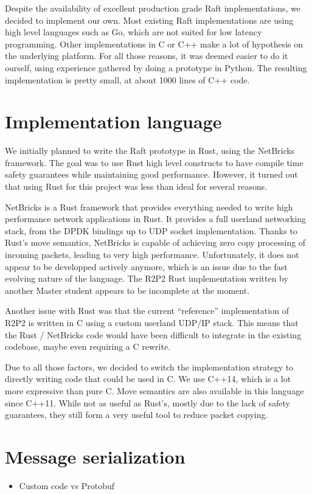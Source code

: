 Despite the availability of excellent production grade Raft implementations, we decided to implement our own.
Most existing Raft implementations are using high level languages such as Go, which are not suited for low latency programming.
Other implementations in C or C++ make a lot of hypothesis on the underlying platform.
For all those reasons, it was deemed easier to do it ourself, using experience gathered by doing a prototype in Python.
The resulting implementation is pretty small, at about 1000 lines of C++ code.

\section{Implementation language}

We initially planned to write the Raft prototype in Rust, using the NetBricks\cite{netbricks} framework.
The goal was to use Rust high level constructs to have compile time safety guarantees while maintaining good performance.
However, it turned out that using Rust for this project was less than ideal for several reasons.

NetBricks\cite{netbricks} is a Rust framework that provides everything needed to write high performance network applications in Rust.  %
It provides a full userland networking stack, from the DPDK bindings up to UDP socket implementation.
Thanks to Rust's move semantics, NetBricks is capable of achieving zero copy processing of incoming packets, leading to very high performance.
Unfortunately, it does not appear to be developped actively anymore, which is an issue due to the fast evolving nature of the language.
The R2P2 Rust implementation\cite{ogier} written by another Master student appears to be incomplete at the moment.

Another issue with Rust was that the current ``reference'' implementation of R2P2 is written in C using a custom userland UDP/IP stack.
This means that the Rust / NetBricks code would have been difficult to integrate in the existing codebase, maybe even requiring a C rewrite.

Due to all those factors, we decided to switch the implementation strategy to directly writing code that could be used in C.
We use C++14, which is a lot more expressive than pure C.
Move semantics are also available in this language since C++11.
While not as useful as Rust's, mostly due to the lack of safety guarantees, they still form a very useful tool to reduce packet copying.

\section{Message serialization}


\begin{itemize}
    \item Custom code vs Protobuf
\end{itemize}

